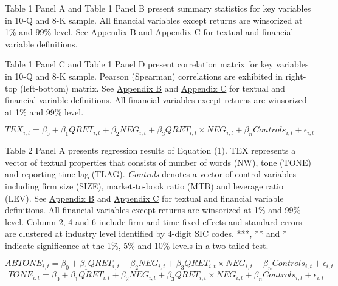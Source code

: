 

Table 1 Panel A and Table 1 Panel B present summary statistics for key variables in 10-Q and 8-K sample. All financial variables except returns are winsorized at 1\% and 99\% level. See \hyperref[appb]{Appendix B} and \hyperref[appc]{Appendix C} for textual and financial variable definitions.

\newpage
\begin{landscape}


Table 1 Panel C and Table 1 Panel D present correlation matrix for key variables in 10-Q and 8-K sample. Pearson (Spearman) correlations are exhibited in right-top (left-bottom) matrix. See \hyperref[appb]{Appendix B} and \hyperref[appc]{Appendix C} for textual and financial variable definitions. All financial variables except returns are winsorized at 1\% and 99\% level. 
\end{landscape}

\newpage

\setcounter{equation}{0}
\begin{equation}
TEX_{i,t}=\beta_0+\beta_1QRET_{i,t}+\beta_2NEG_{i,t}+\beta_3QRET_{i,t}\times NEG_{i,t}+\beta_nControls_{i,t}+\epsilon_{i,t}
\end{equation}

Table 2 Panel A presents regression results of Equation (1). TEX represents a vector of textual properties that consists of number of words (NW), tone (TONE) and reporting time lag (TLAG). \textit{Controls} denotes a vector of control variables including firm size (SIZE), market-to-book ratio (MTB) and leverage ratio (LEV). See \hyperref[appb]{Appendix B} and \hyperref[appc]{Appendix C} for textual and financial variable definitions. All financial variables except returns are winsorized at 1\% and 99\% level. Column 2, 4 and 6 include firm and time fixed effects and standard errors are clustered at industry level identified by 4-digit SIC codes. ***, ** and * indicate significance at the 1\%, 5\% and 10\% levels in a two-tailed test.

\newpage

\setcounter{equation}{3}
\begin{equation}
ABTONE_{i,t}=\beta_0+\beta_1QRET_{i,t}+\beta_2NEG_{i,t}+\beta_3QRET_{i,t}\times NEG_{i,t}+\beta_nControls_{i,t}+\epsilon_{i,t}
\end{equation}
\begin{equation}
\begin{split}
TONE_{i,t}=\beta_0+\beta_1QRET_{i,t}+\beta_2NEG_{i,t}+\beta_3QRET_{i,t}\times NEG_{i,t}+\beta_nControls_{i,t}+\epsilon_{i,t}
\end{split}
\end{equation}

